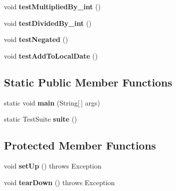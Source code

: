 \begin{DoxyCompactItemize}
\item 
\hypertarget{classorg_1_1joda_1_1time_1_1_test_days_ab10615253b53f4373758b4d18b043523}{void {\bfseries test\-Multiplied\-By\-\_\-int} ()}\label{classorg_1_1joda_1_1time_1_1_test_days_ab10615253b53f4373758b4d18b043523}

\item 
\hypertarget{classorg_1_1joda_1_1time_1_1_test_days_acb1addc3deacb987af0ee8892ef7e7f6}{void {\bfseries test\-Divided\-By\-\_\-int} ()}\label{classorg_1_1joda_1_1time_1_1_test_days_acb1addc3deacb987af0ee8892ef7e7f6}

\item 
\hypertarget{classorg_1_1joda_1_1time_1_1_test_days_a8f1b9f497c7695a23162904d6f948b42}{void {\bfseries test\-Negated} ()}\label{classorg_1_1joda_1_1time_1_1_test_days_a8f1b9f497c7695a23162904d6f948b42}

\item 
\hypertarget{classorg_1_1joda_1_1time_1_1_test_days_ad32946358c5c3d9e2eb246a4ff04faf2}{void {\bfseries test\-Add\-To\-Local\-Date} ()}\label{classorg_1_1joda_1_1time_1_1_test_days_ad32946358c5c3d9e2eb246a4ff04faf2}

\end{DoxyCompactItemize}
\subsection*{Static Public Member Functions}
\begin{DoxyCompactItemize}
\item 
\hypertarget{classorg_1_1joda_1_1time_1_1_test_days_a7ef6002f694db4a68ace56b7138e869e}{static void {\bfseries main} (String\mbox{[}$\,$\mbox{]} args)}\label{classorg_1_1joda_1_1time_1_1_test_days_a7ef6002f694db4a68ace56b7138e869e}

\item 
\hypertarget{classorg_1_1joda_1_1time_1_1_test_days_affa01865264513d2704e00ca154818b6}{static Test\-Suite {\bfseries suite} ()}\label{classorg_1_1joda_1_1time_1_1_test_days_affa01865264513d2704e00ca154818b6}

\end{DoxyCompactItemize}
\subsection*{Protected Member Functions}
\begin{DoxyCompactItemize}
\item 
\hypertarget{classorg_1_1joda_1_1time_1_1_test_days_a5039bc91e7cec6a7ef3a00b7033cceb9}{void {\bfseries set\-Up} ()  throws Exception }\label{classorg_1_1joda_1_1time_1_1_test_days_a5039bc91e7cec6a7ef3a00b7033cceb9}

\item 
\hypertarget{classorg_1_1joda_1_1time_1_1_test_days_a25f609fb9464e2dfa0611f24ac020d5d}{void {\bfseries tear\-Down} ()  throws Exception }\label{classorg_1_1joda_1_1time_1_1_test_days_a25f609fb9464e2dfa0611f24ac020d5d}

\end{DoxyCompactItemize}


